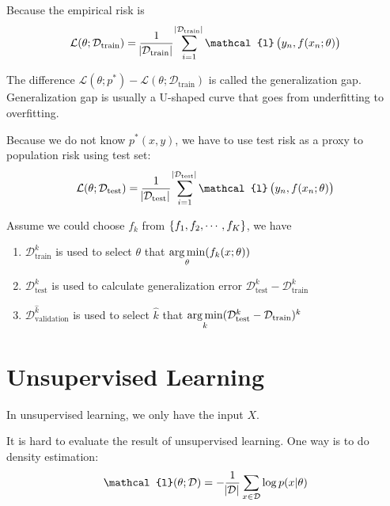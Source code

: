 \begin{definition}
    Because the empirical risk is 
    \begin{equation}
        \mathcal{L}(\theta;\mathcal{D}_{\text{train}}) = \frac{1}{\absolutevalue{\mathcal{D}_{\text{train}}}} \sum_{i=1}^{\absolutevalue{\mathcal{D}_{\text{train}}}} \mathcal{l}\left( y_n, f(x_n; \theta) \right)
    \end{equation}
    
    The difference $\mathcal{L}(\theta;p^*) - \mathcal{L}(\theta;\mathcal{D}_{\text{train}})$ is called the generalization gap. Generalization gap is usually a U-shaped curve that goes from underfitting to overfitting.
    
    Because we do not know $p^*(x,y)$, we have to use test risk as a proxy to population risk using test set:
    \begin{equation}
        \mathcal{L}(\theta;\mathcal{D}_{\text{test}}) = \frac{1}{\absolutevalue{\mathcal{D}_{\text{test}}}} \sum_{i=1}^{\absolutevalue{\mathcal{D}_{\text{test}}}} \mathcal{l}\left( y_n, f(x_n; \theta) \right)
    \end{equation}
\end{definition}

Assume we could choose $f_k$ from $\set{f_1, f_2, \cdots, f_K}$, we have
\begin{enumerate}
    \item $\mathcal{D}_{\text{train}}^k$ is used to select $\theta$ that $\mathop{\arg\min}\limits_{\theta}(f_k(x;\theta))$
    \item $\mathcal{D}_{\text{test}}^k$ is used to calculate generalization error $\mathcal{D}_{\text{test}}^k - \mathcal{D}_{\text{train}}^k$
    \item $\mathcal{D}_{\text{validation}}^{\hat{k}}$ is used to select $\hat{k}$ that $\mathop{\arg\min}\limits_{k}(\mathcal{D}_{\text{test}}^k - \mathcal{D}_{\text{train}})^k$
\end{enumerate}


\section{Unsupervised Learning}

In unsupervised learning, we only have the input $X$.

It is hard to evaluate the result of unsupervised learning. One way is to do density estimation:
\begin{equation}
    \mathcal{l}(\theta; \mathcal{D}) = - \frac{1}{\absolutevalue{\mathcal{D}}} \sum_{x \in \mathcal{D}} \log p(x|\theta)
\end{equation}

